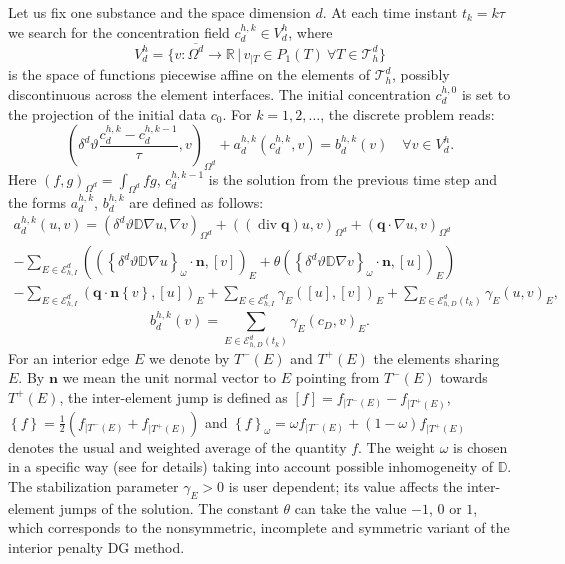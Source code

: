 \documentclass[a4paper]{article}
\def\avg#1{\left\{#1\right\}}
\def\D{{\tn D}}
\def\div{\operatorname{div}}
\def\Ehdir{\mathcal E_{h,D}}         %
\def\Ehint{\mathcal E_{h,I}}       %
\def\jmp#1{[#1]}
\def\n{\vc n}
\def\vc#1{\mathbf{\boldsymbol{#1}}}     %
\def\R{\mathbb R}
\def\sc#1#2{\left(#1,#2\right)}
\def\Th{\mathcal T_h}       %
\def\th{\vartheta}
\def\tn#1{{\mathbb{#1}}}    %
\def\wavg#1{\avg{#1}_\omega}
\def\where{\,|\,}
\begin{document}
Let us fix one substance and the space dimension $d$.
At each time instant $t_k=k\tau$ we search for the concentration field $c_d^{h,k}\in V_d^h$, where
$$ V_d^h = \{v:\overline{\Omega^d}\to\R\where v_{|T}\in P_1(T)~\forall T\in\Th^d\} $$
is the space of functions piecewise affine on the elements of $\Th^d$, possibly discontinuous across the element interfaces.
The initial concentration $c^{h,0}_d$ is set to the projection of the initial data $c_0$.
For $k=1,2,\ldots$, the discrete problem reads:
\begin{equation*}
\sc{\delta^d\th\frac{c_d^{h,k}-c^{h,k-1}_d}\tau}{v}_{\Omega^d} + a^{h,k}_d(c^{h,k}_d,v) = b^{h,k}_d(v) \quad \forall v\in V^h_d.
\end{equation*}
Here $\sc{f}{g}_{\Omega^d}=\int_{\Omega^d} f g$, $c^{h,k-1}_d$ is the solution from the previous time step and the forms $a^{h,k}_d$, $b^{h,k}_d$ are defined as follows:
\begin{multline*}
a^{h,k}_d(u,v) = \sc{\delta^d\th\D\nabla u}{\nabla v}_{\Omega^d}
+ \sc{(\div\vc q)u}{v}_{\Omega^d}
+ \sc{\vc q\cdot\nabla u}{v}_{\Omega^d}\\
- \sum_{E\in\Ehint^d}\left(\sc{\wavg{\delta^d\th\D\nabla u}\cdot\n}{\jmp{v}}_E + \theta\sc{\wavg{\delta^d\th\D\nabla v}\cdot\n}{\jmp{u}}_E\right)\\
- \sum_{E\in\Ehint^d}\sc{\vc q\cdot\n\avg{v}}{\jmp{u}}_E
+ \sum_{E\in\Ehint^d}\gamma_E\sc{\jmp{u}}{\jmp{v}}_E
+ \sum_{E\in\Ehdir^d(t_k)}\gamma_E\sc{u}{v}_E,
\end{multline*}
% 
\begin{equation*}
b^{h,k}_d(v) = \sum_{E\in\Ehdir^d(t_k)}\gamma_E\sc{c_D}{v}_E.
\end{equation*}
For an interior edge $E$ we denote by $T^-(E)$ and $T^+(E)$ the elements sharing $E$.
By $\n$ we mean the unit normal vector to $E$ pointing from $T^-(E)$ towards $T^+(E)$, the inter-element jump is defined as $\jmp{f}=f_{|T^-(E)}-f_{|T^+(E)}$, $\avg{f}=\frac12(f_{|T^-(E)} + f_{|T^+(E)})$ and $\wavg{f}=\omega f_{|T^-(E)} + (1-\omega) f_{|T^+(E)}$ denotes the usual and weighted average of the quantity $f$.
The weight $\omega$ is chosen in a specific way (see \cite{ern_stephansen_zunino} for details) taking into account possible inhomogeneity of $\D$.
The stabilization parameter $\gamma_E>0$ is user dependent; its value affects the inter-element jumps of the solution.
The constant $\theta$ can take the value $-1$, $0$ or $1$, which corresponds to the nonsymmetric, incomplete and symmetric variant of the interior penalty DG method.
\end{document}
